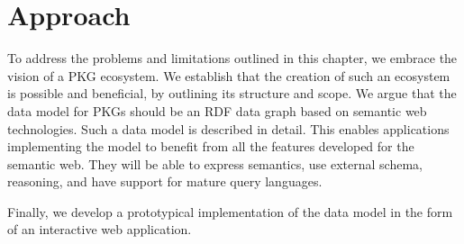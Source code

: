 \section{Approach}
To address the problems and limitations outlined in this chapter, we embrace the vision of a PKG ecosystem. We establish that the creation of such an ecosystem is possible and beneficial, by outlining its structure and scope. We argue that the data model for PKGs should be an RDF data graph based on semantic web technologies. Such a data model is described in detail. This enables applications implementing the model to benefit from all the features developed for the semantic web. They will be able to express semantics, use external schema, reasoning, and have support for mature query languages. 

Finally, we develop a prototypical implementation of the data model in the form of an interactive web application.



